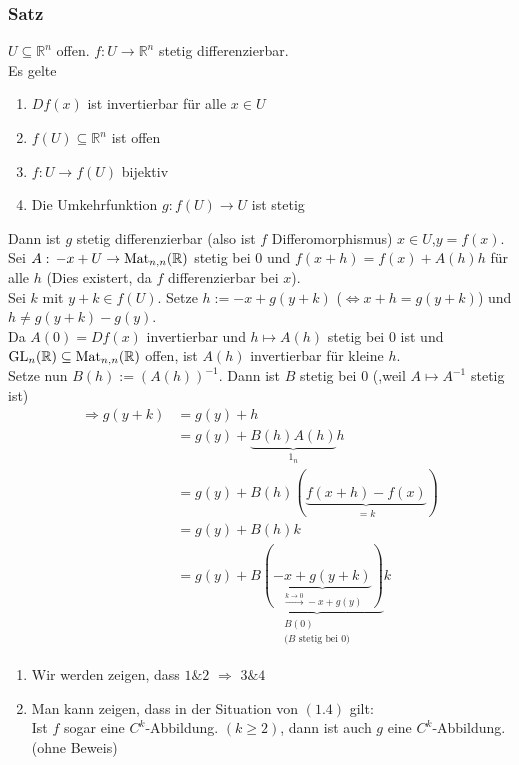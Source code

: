 \subsubsection{Satz} %
\label{satz14}
$ U \subseteq \mathbb{R}^n$ offen. $ f: U \to \mathbb{R}^n $ stetig differenzierbar. \\
Es gelte
\begin{enumerate}
	\item $Df(x)$ ist invertierbar für alle $x \in U$
	\item $f(U) \subseteq \mathbb{R}^n$ ist offen
	\item $f:U \to f(U)$ bijektiv
	\item Die Umkehrfunktion $g:f(U) \to U$ ist stetig
\end{enumerate}
Dann ist $g$ stetig differenzierbar (also ist $f$  Differomorphismus)
 $x \in U$,$y=f(x)$. Sei $A: \,-x+U \to \operatorname{Mat}_{n,n}(\mathbb{R})$ stetig bei $0$ und $f(x+h)=f(x)+A(h)h$ für alle $h$ (Dies existert, da $f$ differenzierbar bei $x$). \\
Sei $k$ mit $y+k \in f(U)$. Setze $h:= -x+g(y+k)$ ($\Leftrightarrow x+h=g(y+k)$) und $h \neq g(y+k)-g(y)$. \\
Da $A(0)=Df(x)$ invertierbar und $h \mapsto A(h)$ stetig bei $0$ ist und $\operatorname{GL}_n(\mathbb{R}) \subseteq \operatorname{Mat}_{n,n}(\mathbb{R})$ offen, ist $A(h)$ invertierbar für kleine $h$. \\
Setze nun $B(h):=(A(h))^{-1}$. Dann ist $B$ stetig bei $0$ (,weil $A \mapsto A^{-1}$ stetig ist)
\begin{align*}
	\Rightarrow g(y+k)&= g(y)+h \\
	&= g(y)+ \underset{1_n}{\underbrace{B(h)A(h)}}h \\
	&= g(y) + B(h)(\underset{=k}{\underbrace{f(x+h)-f(x)}}) \\
	&= g(y) + B(h)k \\
	&= g(y) + \underset{\substack{B(0) \\ \text{($B$ stetig bei $0$)}}}{\underbrace{B(\underset{\stackrel{k \to 0}{\longrightarrow}-x+g(y)}{\underbrace{-x+g(y+k)}})}}k
\end{align*} 
\bewende
{}
\begin{enumerate}
	\item Wir werden zeigen, dass $1 \& 2$ $\Rightarrow$ $3 \& 4$
	\item Man kann zeigen, dass in der Situation von $(1.4)$ gilt: \\
	Ist $f$ sogar eine $C^k$-Abbildung. $(k \geq 2)$, dann ist auch $g$ eine $C^k$-Abbildung. (ohne Beweis)
\end{enumerate}
